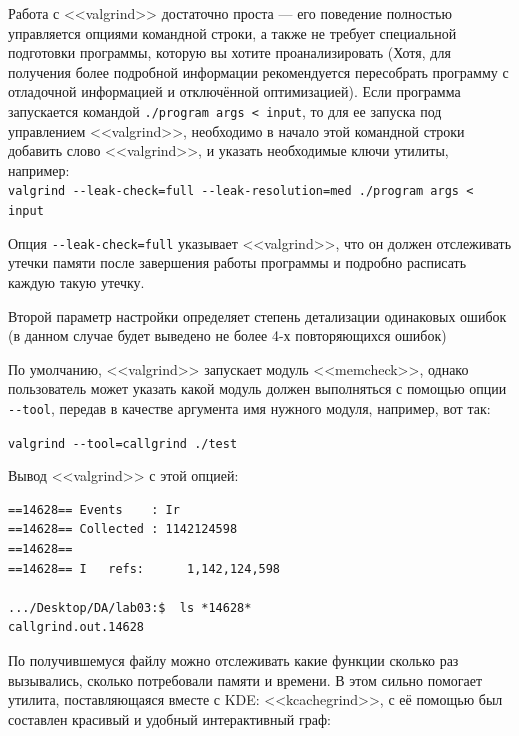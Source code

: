 \documentclass[12pt]{article}
\begin{document}
Работа с <<valgrind>> достаточно проста — его поведение полностью управляется опциями командной строки, а также не требует специальной подготовки программы, которую вы хотите проанализировать (Хотя, для получения более подробной  информации рекомендуется пересобрать программу с отладочной информацией и отключённой оптимизацией). Если программа запускается командой  \lstinline$./program args < input$, то для ее запуска под управлением <<valgrind>>, необходимо в начало этой командной строки добавить слово <<valgrind>>, и указать необходимые ключи утилиты, например:\\
\lstinline|valgrind --leak-check=full --leak-resolution=med ./program args < input|

Опция \lstinline|--leak-check=full| указывает <<valgrind>>, что он должен отслеживать утечки памяти после завершения работы программы и подробно расписать каждую такую утечку.


Второй параметр настройки определяет степень детализации одинаковых ошибок (в данном случае будет выведено не более 4-х повторяющихся ошибок)
\smallbreak

По умолчанию, <<valgrind>> запускает модуль <<memcheck>>, однако пользователь может указать какой модуль должен выполняться с помощью опции \lstinline|--tool|, передав в качестве аргумента имя нужного модуля, например, вот так:

\lstinline|valgrind --tool=callgrind ./test|

Вывод <<valgrind>> с этой опцией:
{\footnotesize
\begin{lstlisting}
==14628== Events    : Ir
==14628== Collected : 1142124598
==14628== 
==14628== I   refs:      1,142,124,598

.../Desktop/DA/lab03:$  ls *14628*                                                                                                                                             
callgrind.out.14628
\end{lstlisting}}

По получившемуся файлу можно отслеживать какие функции сколько раз вызывались, сколько потребовали памяти и времени. В этом сильно помогает утилита, поставляющаяся вместе с KDE: <<kcachegrind>>, с её помощью был составлен красивый и удобный интерактивный граф:
\end{document}
